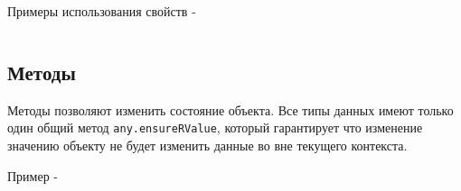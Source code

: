 \noindent Примеры использования свойств -
\inputminted[linenos]{icl}{../sources/propertiesmain.icL}

\subsection{Методы}

Методы позволяют изменить состояние объекта. Все типы данных имеют только один общий метод \texttt{any.ensureRValue}, который гарантирует что изменение значению объекту не будет изменить данные во вне текущего контекста.

\noindent Пример -
\inputminted[linenos]{icl}{../sources/anyensureRValue.icL}


